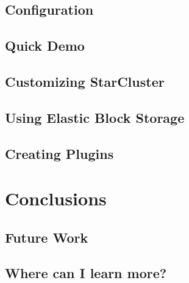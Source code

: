 \documentclass[english,compress]{beamer}
\begin{document}
\subsection{Configuration}

\subsection{Quick Demo}

\subsection{Customizing StarCluster}

\subsection{Using Elastic Block Storage}

\subsection{Creating Plugins}

\questionframe{}

\section{Conclusions}
\subsection{Future Work}

\subsection{Where can I learn more?}

\end{document}
